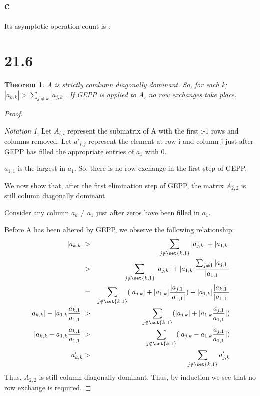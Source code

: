 \documentclass[10pt]{amsart}
\newtheorem{thm}{Theorem}[subsection]
\theoremstyle{remark}
\newtheorem*{notation}{Notation}
\begin{document}
\subsection{c}
Its asymptotic operation count is :
\tbc

\section{21.6}
\begin{thm}
A is strictly comlumn diagonally dominant. So, for each k; $|a_{k,k}| > \sum_{j \neq k} |a_{j,k}|$. If GEPP is applied to A, no row exchanges take place.
\end{thm}
\begin{proof}
\begin{notation}
Let $A_{i,i}$ represent the submatrix of A with the first i-1 rows and columns removed. Let $a'_{i,j}$ represent the element at row i and column j just after GEPP has filled the appropriate entries of $a_{1}$ with 0.

\end{notation}

$a_{1,1}$ is the largest in $a_{1}$. So, there is no row exchange in the first step of GEPP.

We now show that, after the first elimination step of GEPP, the matrix $A_{2,2}$ is still column diagonally dominant.

Consider any column $a_{k} \neq a_{1}$ just after zeros have been filled in $a_{1}$.

Before A has been altered by GEPP, we observe the following relationship:
\begin{eqnarray*}
|a_{k,k}| &>& \sum_{j \notin \set{k,1}}|a_{j,k}| + |a_{1,k}|\\
&>& \sum_{j \notin \set{k,1}}|a_{j,k}| + |a_{1,k}|\frac{\sum_{j \neq 1}|a_{j,1}|}{|a_{1,1}|}\\
&=& \sum_{j \notin \set{k,1}}(|a_{j,k}| + |a_{1,k}|\frac{|a_{j,1}|}{|a_{1,1}|}) + |a_{1,k}|\frac{|a_{k,1}|}{|a_{1,1}|}\\
|a_{k,k}| -|a_{1,k}\frac{a_{k,1}}{a_{1,1}}|&>& \sum_{j \notin \set{k,1}}(|a_{j,k}| + |a_{1,k}\frac{a_{j,1}}{a_{1,1}}|)\\
|a_{k,k} -a_{1,k}\frac{a_{k,1}}{a_{1,1}}|&>& \sum_{j \notin \set{k,1}}(|a_{j,k}-a_{1,k}\frac{a_{j,1}}{a_{1,1}}|)\\
a'_{k,k} &>& \sum_{j \notin \set{k,1}} a'_{j,k}\\
\end{eqnarray*}
Thus, $A_{2,2}$ is still column diagonally dominant. Thus, by induction we see that no row exchange is required.
\end{proof}
\end{document}
